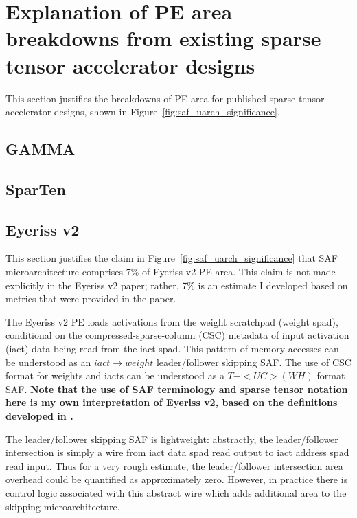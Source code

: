 \chapter{Explanation of PE area breakdowns from existing sparse tensor accelerator designs}
\label{appendix:pe_breakdowns}

This section justifies the breakdowns of PE area for published sparse tensor accelerator designs, shown in Figure~\ref{fig:saf_uarch_significance}.

\section{GAMMA\cite{gamma}}

\section{SparTen\cite{sparten}}

\section{Eyeriss v2\cite{eyerissv2}}

This section justifies the claim in Figure~\ref{fig:saf_uarch_significance} that SAF microarchitecture comprises 7\% of Eyeriss v2 PE area. This claim is not made explicitly in the Eyeriss v2 paper\cite{eyerissv2}; rather, 7\% is an estimate I developed based on metrics that were provided in the paper.

The Eyeriss v2 PE loads activations from the weight scratchpad (weight spad), conditional on the compressed-sparse-column (CSC) metadata of input activation (iact) data being read from the iact spad\cite{eyerissv2}. This pattern of memory accesses can be understood as an $iact \rightarrow weight$ leader/follower skipping SAF. The use of CSC format for weights and iacts can be understood as a $T-<UC>(WH)$ format SAF. \textbf{Note that the use of SAF terminology and sparse tensor notation here is my own interpretation of Eyeriss v2, based on the definitions developed in \cite{sparseloop}\cite{szebook}.}

The leader/follower skipping SAF is lightweight: abstractly, the leader/follower intersection is simply a wire from iact data spad read output to iact address spad read input. Thus for a very rough estimate, the leader/follower intersection area overhead could be quantified as approximately zero. However, in practice there is control logic associated with this abstract wire which adds additional area to the skipping microarchitecture. 

